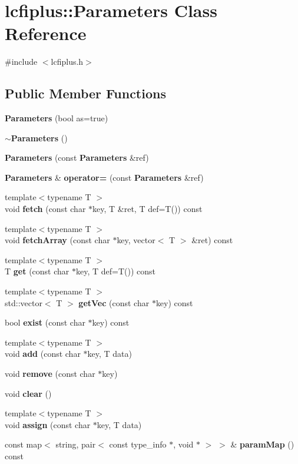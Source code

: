 \section{lcfiplus\+:\+:Parameters Class Reference}
\label{classlcfiplus_1_1Parameters}


{\ttfamily \#include $<$lcfiplus.\+h$>$}

\subsection*{Public Member Functions}
\begin{DoxyCompactItemize}
\item 
\textbf{ Parameters} (bool as=true)
\item 
\textbf{ $\sim$\+Parameters} ()
\item 
\textbf{ Parameters} (const \textbf{ Parameters} \&ref)
\item 
\textbf{ Parameters} \& \textbf{ operator=} (const \textbf{ Parameters} \&ref)
\item 
{\footnotesize template$<$typename T $>$ }\\void \textbf{ fetch} (const char $\ast$key, T \&ret, T def=T()) const
\item 
{\footnotesize template$<$typename T $>$ }\\void \textbf{ fetch\+Array} (const char $\ast$key, vector$<$ T $>$ \&ret) const
\item 
{\footnotesize template$<$typename T $>$ }\\T \textbf{ get} (const char $\ast$key, T def=T()) const
\item 
{\footnotesize template$<$typename T $>$ }\\std\+::vector$<$ T $>$ \textbf{ get\+Vec} (const char $\ast$key) const
\item 
bool \textbf{ exist} (const char $\ast$key) const
\item 
{\footnotesize template$<$typename T $>$ }\\void \textbf{ add} (const char $\ast$key, T data)
\item 
void \textbf{ remove} (const char $\ast$key)
\item 
void \textbf{ clear} ()
\item 
{\footnotesize template$<$typename T $>$ }\\void \textbf{ assign} (const char $\ast$key, T data)
\item 
const map$<$ string, pair$<$ const type\+\_\+info $\ast$, void $\ast$ $>$ $>$ \& \textbf{ param\+Map} () const
\end{DoxyCompactItemize}


